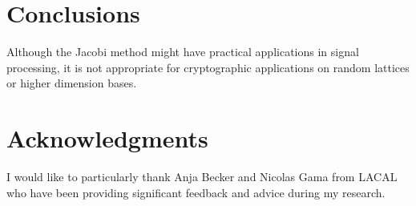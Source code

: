 \documentclass[10pt, a4paper]{article}
\begin{document}
\section{Conclusions}

Although the Jacobi method might have practical applications in signal processing, it is not appropriate for cryptographic applications on random lattices or higher dimension bases. 

\section{Acknowledgments}
I would like to particularly thank Anja Becker and Nicolas Gama from LACAL who have been providing significant feedback and advice during my research.



\end{document}
